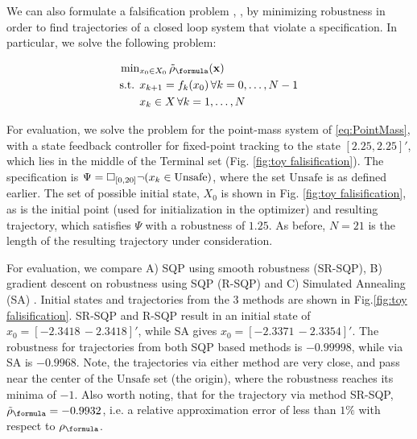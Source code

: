We can also formulate a falsification problem \cite{AbbasATVA11_LinFalsification}, \cite{AbbasF_HybridSA12}, \cite{Deshmukh15_IterativeApproaches} by minimizing robustness in order to find trajectories of a closed loop system that violate a specification. In particular, we solve the following problem:

\begin{subequations}
\vspace{-10pt}
\label{eq:falsification}
\begin{align}
\text{min}&_{x_0 \in X_0 } \, \srob_{\formula}(\sstraj) \nonumber \\
\text{s.t. } & x_{k+1} = f_k(x_0) \, \forall k=0,\dotsc,N-1 \\
&  x_{k} \in X \, \forall k=1,\dotsc,N
\end{align}
\end{subequations}

For evaluation, we solve the problem for the point-mass system of \eqref{eq:PointMass}, with a state feedback controller for fixed-point tracking to the state $[2.25,2.25]'$, which lies in the middle of the Terminal set (Fig. \ref{fig:toy falisification}). The specification is $\Psi=\square_{[0,20]} \neg (x_k \in \text{Unsafe})$, where the set $\text{Unsafe}$ is as defined earlier. The set of possible initial state, $X_0$ is shown in Fig. \ref{fig:toy falisification}, as is the initial point (used for initialization in the optimizer) and resulting trajectory, which satisfies $\Psi$ with a robustness of $1.25$. As before, $N=21$ is the length of the resulting trajectory under consideration.

For evaluation, we compare A) SQP using smooth robustness (SR-SQP), B) gradient descent on robustness using SQP (R-SQP) and C) Simulated Annealing (SA) \cite{SA_book}. Initial states and trajectories from the 3 methods are shown in Fig.\ref{fig:toy falisification}. SR-SQP and R-SQP result in an initial state of $x_0=[-2.3418\, -2.3418]'$, while SA gives $x_0=[-2.3371\, -2.3354]'$. The robustness for trajectories from both SQP based methods is $-0.99998$, while via SA is $-0.9968$. Note, the trajectories via either method are very close, and pass near the center of the $\text{Unsafe}$ set (the origin), where the robustness reaches its minima of $-1$. Also worth noting, that for the trajectory via method SR-SQP, $\srob_{\formula}=-0.9932$, i.e. a relative approximation error of less than $1\%$ with respect to $\rob_{\formula}$.


